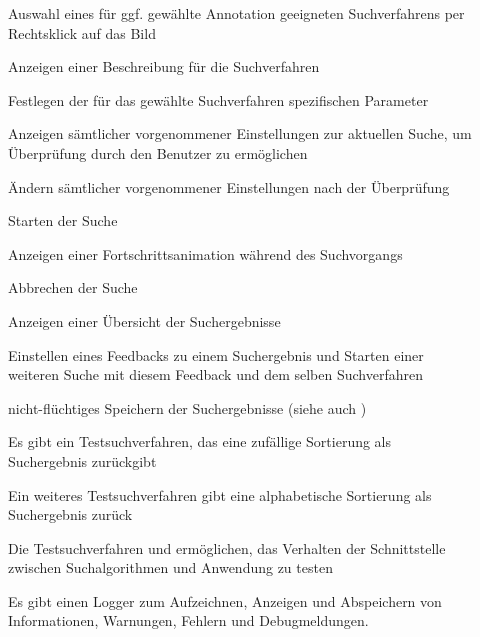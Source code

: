 \begin{description}
	\item[] Auswahl eines für ggf. gewählte Annotation geeigneten Suchverfahrens per Rechtsklick auf das Bild
	\item[] Anzeigen einer Beschreibung für die Suchverfahren
	\item[] Festlegen der für das gewählte Suchverfahren spezifischen Parameter
	\item[] Anzeigen sämtlicher vorgenommener Einstellungen zur aktuellen Suche, um Überprüfung durch den Benutzer zu ermöglichen
	\item[] Ändern sämtlicher vorgenommener Einstellungen nach der Überprüfung
	\newline
	\item[] Starten der Suche
	\item[] Anzeigen einer Fortschrittsanimation während des Suchvorgangs
	\item[] Abbrechen der Suche
	\newline
	\item[] Anzeigen einer \"Ubersicht der Suchergebnisse  
	\item[] Einstellen eines Feedbacks zu einem Suchergebnis und Starten einer weiteren Suche mit diesem Feedback und dem selben Suchverfahren
	\item[]
	\item[] nicht-flüchtiges Speichern der Suchergebnisse (siehe auch )
	\newline
	\item[] Es gibt ein Testsuchverfahren, das eine zufällige Sortierung als Suchergebnis zurückgibt
	\item[] Ein weiteres Testsuchverfahren gibt eine alphabetische Sortierung als Suchergebnis zurück
	\item[] Die Testsuchverfahren  und  ermöglichen, das Verhalten der Schnittstelle zwischen Suchalgorithmen und Anwendung zu testen
	\item[] Es gibt einen Logger zum Aufzeichnen, Anzeigen und Abspeichern von Informationen, Warnungen, Fehlern und Debugmeldungen.
	 
\end{description}

